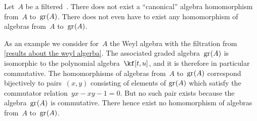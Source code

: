 \begin{warning}
  Let~$A$ be a filtered~\algebra{$\kf$}.
  There does not exist a \enquote{canonical} algebra homomorphism from~$A$ to~$\gr(A)$.
  There does not even have to exist any homomorphism of algebras from~$A$ to~$\gr(A)$.

  As an example we consider for~$A$ the Weyl algebra with the filtration from \cref{results about the weyl algerba}.
  The associated graded algebra~$\gr(A)$ is isomorphic to the polynomial algebra~$\kf[t,u]$, and it is therefore in particular commutative.
  The homomorphisms of algebras from~$A$ to~$\gr(A)$ correspond bijectively to pairs~$(x, y)$ consisting of elements of $\gr(A)$ which satisfy the commutator relation~$yx - xy - 1 = 0$.
  But no such pair exists because the algebra~$\gr(A)$ is commutative.
  There hence exist no homomorphism of algebras from~$A$ to~$\gr(A)$.
\end{warning}






